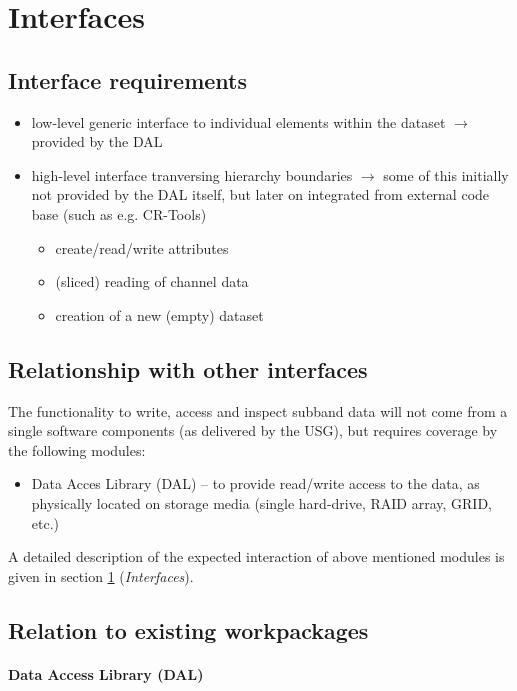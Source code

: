 \documentclass[a4paper,10pt,bibtotoc]{scrartcl}
\begin{document}
\section{Interfaces}
\label{sec:interfaces}

\subsection{Interface requirements}
\label{sec:interface requirements}

\begin{itemize}
\item low-level generic interface to individual elements within the dataset 
  $\rightarrow$ provided by the DAL
\item high-level interface tranversing hierarchy boundaries $\rightarrow$ some
  of this initially not provided by the DAL itself, but later on integrated from
  external code base (such as e.g. CR-Tools)
  \begin{itemize}
  \item create/read/write attributes
  \item (sliced) reading of channel data
  \item creation of a new (empty) dataset
  \end{itemize}
\end{itemize}

\subsection{Relationship with other interfaces}

The functionality to write, access and inspect subband data will not come
from a single software components (as delivered by the USG), but requires
coverage by the following modules:
\begin{itemize}
\item Data Acces Library (DAL) -- to provide read/write access to the data,
  as physically located on storage media (single hard-drive, RAID array, GRID,
  etc.)
\end{itemize}
A detailed description of the expected interaction of above mentioned modules
is given in section \ref{sec:interfaces} (\textsl{Interfaces}).

\subsection{Relation to existing workpackages}

\paragraph{Data Access Library (DAL)}
\end{document}
